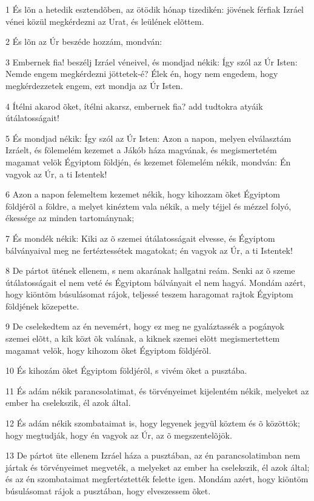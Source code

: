 \par 1 És lõn a hetedik esztendõben, az ötödik hónap tizedikén: jövének férfiak Izráel vénei közül megkérdezni az Urat, és leülének elõttem.
\par 2 És lõn az Úr beszéde hozzám, mondván:
\par 3 Embernek fia! beszélj Izráel véneivel, és mondjad nékik: Így szól az Úr Isten: Nemde engem megkérdezni jöttetek-é? Élek én, hogy nem engedem, hogy megkérdezzetek engem, ezt mondja az Úr Isten.
\par 4 Ítélni akarod õket, ítélni akarsz, embernek fia? add tudtokra atyáik útálatosságait!
\par 5 És mondjad nékik: Így szól az Úr Isten: Azon a napon, melyen elválasztám Izráelt, és fölemelém kezemet a Jákób háza magvának, és megismertetém magamat velök Égyiptom földjén, és kezemet fölemelém nékik, mondván: Én vagyok az Úr, a ti Istentek!
\par 6 Azon a napon felemeltem kezemet nékik, hogy kihozzam õket Égyiptom földjérõl a földre, a melyet kinéztem vala nékik, a mely téjjel és mézzel folyó, ékessége az minden tartománynak;
\par 7 És mondék nékik: Kiki az õ szemei útálatosságait elvesse, és Égyiptom bálványaival meg ne fertéztessétek magatokat; én vagyok az Úr, a ti Istentek!
\par 8 De pártot ütének ellenem, s nem akarának hallgatni reám. Senki az õ szeme útálatosságait el nem veté és Égyiptom bálványait el nem hagyá. Mondám azért, hogy kiöntöm búsulásomat rájok, teljessé teszem haragomat rajtok Égyiptom földjének közepette.
\par 9 De cselekedtem az én nevemért, hogy ez meg ne gyaláztassék a pogányok szemei elõtt, a kik közt õk valának, a kiknek szemei elõtt megismertettem magamat velök, hogy kihozom õket Égyiptom földjérõl.
\par 10 És kihozám õket Égyiptom földjérõl, s vivém õket a pusztába.
\par 11 És adám nékik parancsolatimat, és törvényeimet kijelentém nékik, melyeket az ember ha cselekszik, él azok által.
\par 12 És adám nékik szombataimat is, hogy legyenek jegyül köztem és õ közöttök; hogy megtudják, hogy én vagyok az Úr, az õ megszentelõjök.
\par 13 De pártot üte ellenem Izráel háza a pusztában, az én parancsolatimban nem jártak és törvényeimet megveték, a melyeket az ember ha cselekszik, él azok által; és az én szombataimat megfertéztették felette igen. Mondám azért, hogy kiöntöm búsulásomat rájok a pusztában, hogy elveszessem õket.
